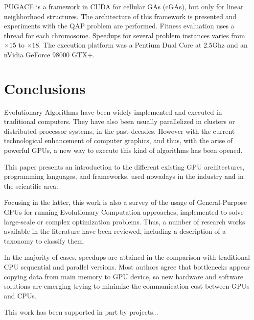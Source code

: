 \documentclass[Afour,sageh,times]{sagej}
\begin{document}
PUGACE\citep{5586286} is a framework in CUDA for cellular GAs (cGAs), but only for linear neighborhood structures. The architecture of this framework is presented and experiments with the QAP problem are performed. Fitness evaluation uses a thread for each chromosome. Speedups for several problem instances varies from $\times15$ to $\times18$. The execution platform was a Pentium Dual Core at 2.5Ghz and an nVidia GeForce 98000 GTX+.

\section{Conclusions}
\label{sec:conclusions}

Evolutionary Algorithms have been widely implemented and executed in traditional computers. They have also been usually parallelized in clusters or distributed-processor systems, in the past decades. However with the current technological enhancement of computer graphics, and thus, with the arise of powerful GPUs, a new way to execute this kind of algorithms has been opened.

This paper presents an introduction to the different existing GPU architectures, programming languages, and frameworks, used nowadays in the industry and in the scientific area.

Focusing in the latter, this work is also a survey of the usage of General-Purpose GPUs for running Evolutionary Computation approaches, implemented to solve large-scale or complex optimization problems. Thus, a number of research works available in the literature have been reviewed, including a description of a taxonomy to classify them. 

In the majority of cases, speedups are attained in the comparison with
traditional CPU sequential and parallel versions. Most authors agree
that bottlenecks appear copying data from main memory to GPU device,
so new hardware and software solutions are emerging trying to minimize
the communication cost between GPUs and CPUs.



\begin{acks}
This work has been supported in part by projects...
\end{acks}






\end{document}
